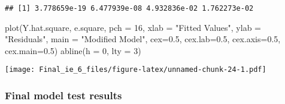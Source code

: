 \documentclass[
  12pt,
]{article}
\newenvironment{Shaded}{\begin{snugshade}}{\end{snugshade}}
\newcommand{\AttributeTok}[1]{\textcolor[rgb]{0.77,0.63,0.00}{#1}}
\newcommand{\DecValTok}[1]{\textcolor[rgb]{0.00,0.00,0.81}{#1}}
\newcommand{\FloatTok}[1]{\textcolor[rgb]{0.00,0.00,0.81}{#1}}
\newcommand{\FunctionTok}[1]{\textcolor[rgb]{0.00,0.00,0.00}{#1}}
\newcommand{\NormalTok}[1]{#1}
\newcommand{\StringTok}[1]{\textcolor[rgb]{0.31,0.60,0.02}{#1}}
\begin{document}
\begin{verbatim}
## [1] 3.778659e-19 6.477939e-08 4.932836e-02 1.762273e-02
\end{verbatim}

\begin{Shaded}
\begin{Highlighting}[]
\FunctionTok{plot}\NormalTok{(Y.hat.square, e.square, }\AttributeTok{pch =} \DecValTok{16}\NormalTok{, }\AttributeTok{xlab =} \StringTok{"Fitted Values"}\NormalTok{, }\AttributeTok{ylab =} \StringTok{"Residuals"}\NormalTok{,}
\AttributeTok{main =} \StringTok{"Modified Model"}\NormalTok{, }\AttributeTok{cex=}\FloatTok{0.5}\NormalTok{, }\AttributeTok{cex.lab=}\FloatTok{0.5}\NormalTok{, }\AttributeTok{cex.axis=}\FloatTok{0.5}\NormalTok{, }\AttributeTok{cex.main=}\FloatTok{0.5}\NormalTok{)}
\FunctionTok{abline}\NormalTok{(}\AttributeTok{h =} \DecValTok{0}\NormalTok{, }\AttributeTok{lty =} \DecValTok{3}\NormalTok{)}
\end{Highlighting}
\end{Shaded}

\texttt{[image: Final\_ie\_6\_files/figure-latex/unnamed-chunk-24-1.pdf]}

\hypertarget{final-model-test-results-1}{%
\subsubsection{Final model test
results}\label{final-model-test-results-1}}
\end{document}
